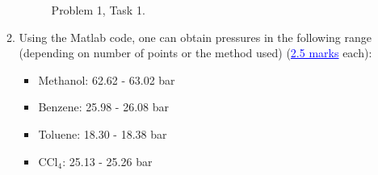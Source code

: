 \documentclass[12pts,a4paper,amsmath,amssymb,floatfix]{article}%
\newcommand{\blue}{\textcolor{blue}}
\begin{document}
\begin{enumerate}[label=\bfseries Problem \arabic*:]
\begin{enumerate}[label=\bfseries Task \arabic*:]
\begin{figure}[h]
{{                        }
                  } 
             \caption{Problem 1, Task 1. }
             \label{Prob1_Task1}
          \end{figure}
%
        \item Using the Matlab code, one can obtain pressures in the following range (depending on number of points or the method used) (\blue{\underline{2.5 marks}} each): 
          \begin{itemize}
             \item Methanol:  62.62 - 63.02 bar
             \item Benzene:   25.98 - 26.08 bar
             \item Toluene:   18.30 - 18.38 bar
             \item CCl$_{4}$:  25.13 - 25.26 bar
          \end{itemize}
      \end{enumerate} 
\clearpage


\end{enumerate}
\end{document}
